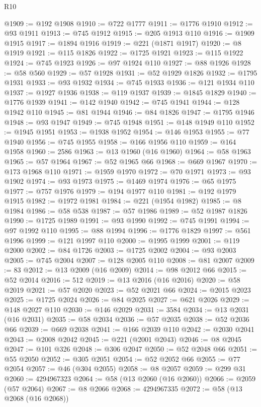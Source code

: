 \begin{lexlean}{R10}
\begin{coremodule}
@1909 := @192 @1908
@1910 := @722 @1777
@1911 := @1776 @1910
@1912 := @93 @1911
@1913 := @745 @1912
@1915 := @205 @1913 @110
@1916 := @1909 @1915
@1917 := @1894 @1916
@1919 := @221 (@1871 @1917)
@1920 := @8 @1919
@1921 := @115 @1826
@1922 := @1725 @1921
@1923 := @115 @1922
@1924 := @745 @1923
@1926 := @97 @1924 @110
@1927 := @88 @1926
@1928 := @58 @560
@1929 := @57 @1928
@1931 := @52 @1929 @1826
@1932 := @1795 @1931
@1933 := @93 @1932
@1934 := @745 @1933
@1936 := @121 @1934 @110
@1937 := @1927 @1936
@1938 := @119 @1937
@1939 := @1845 @1829
@1940 := @1776 @1939
@1941 := @142 @1940
@1942 := @745 @1941
@1944 := @128 @1942 @110
@1945 := @81 @1944
@1946 := @84 @1826
@1947 := @1795 @1946
@1948 := @93 @1947
@1949 := @745 @1948
@1951 := @148 @1949 @110
@1952 := @1945 @1951
@1953 := @1938 @1952
@1954 := @146 @1953
@1955 := @77 @1940
@1956 := @745 @1955
@1958 := @166 @1956 @110
@1959 := @164 @1958
@1960 := 2586
@1963 := @13 @1960 (@16 @1960)
@1964 := @58 @1963
@1965 := @57 @1964
@1967 := @52 @1965 @66
@1968 := @669 @1967
@1970 := @173 @1968 @110
@1971 := @1959 @1970
@1972 := @70 @1971
@1973 := @93 @1902
@1974 := @93 @1973
@1975 := @1469 @1974
@1976 := @65 @1975
@1977 := @757 @1976
@1979 := @194 @1977 @110
@1981 := @192 @1979 @1915
@1982 := @1972 @1981
@1984 := @221 (@1954 @1982)
@1985 := @8 @1984
@1986 := @58 @538
@1987 := @57 @1986
@1989 := @52 @1987 @1826
@1990 := @1725 @1989
@1991 := @93 @1990
@1992 := @745 @1991
@1994 := @97 @1992 @110
@1995 := @88 @1994
@1996 := @1776 @1829
@1997 := @561 @1996
@1999 := @121 @1997 @110
@2000 := @1995 @1999
@2001 := @119 @2000
@2002 := @84 @1726
@2003 := @1725 @2002
@2004 := @93 @2003
@2005 := @745 @2004
@2007 := @128 @2005 @110
@2008 := @81 @2007
@2009 := 83
@2012 := @13 @2009 (@16 @2009)
@2014 := @98 @2012 @66
@2015 := @52 @2014
@2016 := 512
@2019 := @13 @2016 (@16 @2016)
@2020 := @58 @2019
@2021 := @57 @2020
@2023 := @52 @2021 @66
@2024 := @2015 @2023
@2025 := @1725 @2024
@2026 := @84 @2025
@2027 := @621 @2026
@2029 := @148 @2027 @110
@2030 := @146 @2029
@2031 := 3584
@2034 := @13 @2031 (@16 @2031)
@2035 := @58 @2034
@2036 := @57 @2035
@2038 := @52 @2036 @66
@2039 := @669 @2038
@2041 := @166 @2039 @110
@2042 := @2030 @2041
@2043 := @2008 @2042
@2045 := @221 (@2001 @2043)
@2046 := @8 @2045
@2047 := @101 @326
@2048 := @306 @2047
@2050 := @52 @2048 @66
@2051 := @55 @2050
@2052 := @305 @2051
@2054 := @52 @2052 @66
@2055 := @77 @2054
@2057 := @46 (@304 @2055)
@2058 := @8 @2057
@2059 := @299 @31
@2060 := 4294967323
@2064 := @58 (@13 @2060 (@16 @2060))
@2066 := @2059 (@57 @2064)
@2067 := @8 @2066
@2068 := 4294967335
@2072 := @58 (@13 @2068 (@16 @2068))

\end{coremodule}
\end{lexlean}
